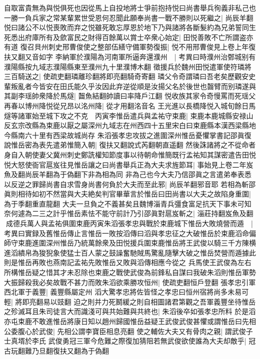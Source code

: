 自取富貴無為與悦俱死也因從馬上自投地將士爭前抱持悦曰尚書舉兵徇義非私己也一勝一負兵家之常某輩累世受恩何忍聞此願奉尚書一戰不勝則以死繼之|{
	尚辰羊翻}
悦曰諸公不以悦喪敗而弃之悦雖死敢忘厚恩於地下乃與諸將各斷髮約為兄弟誓同生死悉出府庫所有及歛富民之財得百餘萬以賞士卒衆心始定|{
	田悦善敗不亡所謂盗亦有道}
復召貝州刺史邢曹俊使之整部伍繕守備軍勢復振|{
	悦不用邢曹俊見上卷上年復扶又翻又音如字}
李納軍於濮陽為河南軍所逼奔還濮州　|{
	考異曰時濮州治鄄城别有濮陽縣按九域志濮陽縣東至濮州九十里濮博木翻}
徵援兵於魏州田悦遣軍使符璘將三百騎送之|{
	使疏吏翻璘離珍翻將即亮翻騎奇寄翻}
璘父令奇謂璘曰吾老矣歷觀安史輩叛亂者今皆安在田氏能久乎汝因此弃逆從順是汝揚父名於後世也齧臂而别璘遂與其副李瑶帥衆降於馬燧|{
	齧魚結翻帥讀曰率降戶江翻}
悦收族其家令奇慢罵而死瑶父再春以博州降悦從兄昂以洺州降|{
	從才用翻洺音名}
王光進以長橋降悦入城旬餘日馬燧等諸軍始至城下攻之不克　丙寅李惟岳遣兵與孟祐守束鹿|{
	束鹿本鹿城縣安禄山反玄宗改縣為束鹿以厭之屬深州九域志在州西四十五里宋白曰束鹿縣本漢西梁縣地今縣南六十里有西梁故城尚存}
朱滔張孝忠攻拔之進圍深州惟岳憂懼掌書記邵眞復說惟岳密為表先遣弟惟簡入朝|{
	復扶又翻說式芮翻朝直遥翻}
然後誅諸將之不從命者身自入朝使妻父冀州刺史鄭詵權知節度事以待朝命惟簡既行孟祐知其謀密遣告田悦悦大怒使衙官扈岌往見惟岳讓之曰尚書舉兵正為大夫求旌節耳|{
	事始見上卷二年岌魚及翻尚辰羊翻為于偽翻下非為相為同}
非為己也今大夫乃信邵眞之言遣弟奉表悉以反逆之罪歸尚書自求雪身尚書何負於大夫而至此邪|{
	尚辰羊翻邪音耶}
若相為斬邵眞則相待如初不然當與大夫絶矣判官畢華言於惟岳曰田尚書以大夫之故陷身重圍|{
	為于季翻重直龍翻}
大夫一旦負之不義甚矣且魏博淄青兵彊食富足抗天下事未可知奈何遽為二三之計乎惟岳素怯不能守前計乃引邵眞對扈岌斬之|{
	淄莊持翻岌魚及翻}
成德兵萬人與孟祐俱圍束鹿丙寅朱滔張孝忠與戰於束鹿城下惟岳大敗燒營而遁　|{
	考異曰實録及舊惟岳傳止言惟岳一敗按滔傳曰滔與孝忠征之大破惟岳於束鹿滔命偏師守束鹿進圍深州惟岳乃統萬餘衆及田悦援兵圍束鹿惟岳將王武俊以騎三千方陳横進滔繢帛為狻猊象使猛士百人蒙之鼓譟奮馳賊馬驚亂隨擊大破之惟岳焚營而遁據此則是惟岳再敗也燕南記孟祐先敗惟岳又敗與滔傳相應今從之}
兵馬使王武俊為左右所構惟岳疑之惜其才未忍除也束鹿之戰使武俊為前鋒私自謀曰我破朱滔則惟岳軍勢大振歸殺我必矣故戰不甚力而敗朱滔欲乘勝攻恒州|{
	使疏吏翻恒戶登翻}
張孝忠引軍西北軍于義豐|{
	義豐縣屬定州}
滔大驚孝忠將佐皆怪之孝忠曰恒州宿將尚多未易可輕|{
	將即亮翻易以豉翻}
迫之則并力死鬭緩之則自相圖諸君第觀之吾軍義豐坐待惟岳之殄滅耳且朱司徒言大而識淺可與共始難與共終也|{
	朱滔後卒如張孝忠所料}
於是滔亦屯束鹿不敢進惟岳將康日知以趙州歸國惟岳益疑王武俊武俊甚懼或謂惟岳曰先相公委腹心於武俊|{
	先相公謂李寶臣相息亮翻}
使之輔佐大夫又有骨肉之親|{
	謂武俊子士真壻於李氏}
武俊勇冠三軍今危難之際復加猜阻若無武俊欲使誰為大夫却敵乎|{
	冠古玩翻難乃旦翻復扶又翻為于偽翻}

